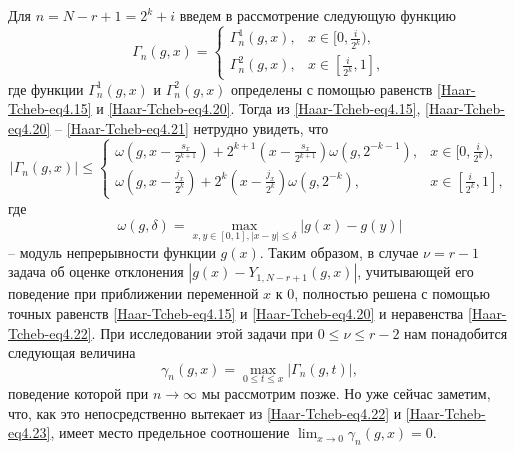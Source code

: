 Для $n=N-r+1=2^k+i$ введем в рассмотрение следующую функцию
 \begin{equation}\label{Haar-Tcheb-eq4.21}
 \Gamma_n(g,x)=\begin{cases}
 \Gamma_n^1(g,x), &\text{$x\in[0,\frac{i}{2^k})$},\\
 \Gamma_n^2(g,x), &\text{$x\in[\frac{i}{2^k},1]$},
  \end{cases}
 \end{equation}
где функции $\Gamma_n^1(g,x)$ и $\Gamma_n^2(g,x)$ определены с помощью равенств \eqref{Haar-Tcheb-eq4.15} и \eqref{Haar-Tcheb-eq4.20}.
Тогда из \eqref{Haar-Tcheb-eq4.15}, \eqref{Haar-Tcheb-eq4.20} -- \eqref{Haar-Tcheb-eq4.21} нетрудно увидеть, что
 \begin{equation}\label{Haar-Tcheb-eq4.22}
 |\Gamma_n(g,x)|\le \begin{cases}\omega\left(g,x-\frac{s_x}{2^{k+1}}\right)+2^{k+1}
(x-\frac{s_x}{2^{k+1}})\omega\left(g,2^{-k-1}\right),&\text{$x\in[0,\frac{i}{2^k})$,}\\
\omega\left(g,x-\frac{j_x}{2^{k}}\right)+2^{k}
(x-\frac{j_x}{2^{k}})\omega\left(g,2^{-k}\right),&\text{$x\in[\frac{i}{2^k},1]$},
\end{cases}
 \end{equation}
где
$$
\omega(g,\delta)=\max_{x,y\in[0,1],|x-y|\le\delta}|g(x)-g(y)|
$$
-- модуль непрерывности функции $g(x)$.
Таким образом, в случае $\nu=r-1$ задача об оценке отклонения $|g(x)-Y_{1,N-r+1}(g,x)|$, учитывающей его поведение при приближении переменной $x$ к $0$, полностью решена с помощью точных равенств  \eqref{Haar-Tcheb-eq4.15} и \eqref{Haar-Tcheb-eq4.20} и неравенства \eqref{Haar-Tcheb-eq4.22}.
При исследовании этой задачи при $0\le\nu\le r-2$ нам понадобится следующая величина
 \begin{equation}\label{Haar-Tcheb-eq4.23}
 \gamma_n(g,x)=\max_{0\le t\le x}|\Gamma_n(g,t)|,
 \end{equation}
 поведение которой при $n\to\infty$  мы рассмотрим позже. Но уже сейчас заметим, что, как это непосредственно вытекает из \eqref{Haar-Tcheb-eq4.22} и  \eqref{Haar-Tcheb-eq4.23}, имеет место предельное соотношение $\lim_{x\to0}\gamma_n(g,x)=0$.

